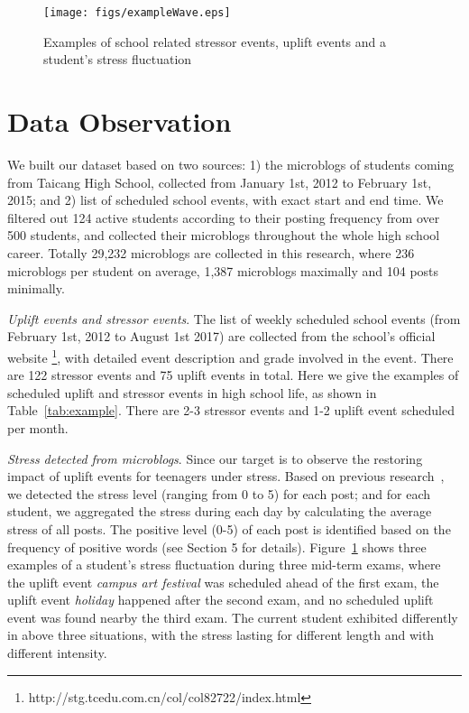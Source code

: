 \begin{figure}
\centering
\caption{Examples of school related stressor events, uplift events and a student's stress fluctuation}
\texttt{[image: figs/exampleWave.eps]}
\label{fig:example}
\end{figure}

\section{Data Observation}
\label{sec:obs}
We built our dataset based on two sources: 1) the microblogs of students coming from Taicang High School,
collected from January 1st, 2012 to February 1st, 2015;
and 2) list of scheduled school events, with exact start and end time.
We filtered out 124 active students according to their posting frequency from over 500 students,
and collected their microblogs throughout the whole high school career. Totally 29,232 microblogs are collected in this research,
where 236 microblogs per student on average, 1,387 microblogs maximally and 104 posts minimally.

\emph{Uplift events and stressor events}.
The list of weekly scheduled school events (from February 1st, 2012 to August 1st 2017) are collected from the school's official website
\footnote{http://stg.tcedu.com.cn/col/col82722/index.html}, with detailed event description and grade involved in the event.
There are 122 stressor events and 75 uplift events in total.
Here we give the examples of scheduled uplift and stressor events in high school life, as shown in Table~\ref{tab:example}.
There are 2-3 stressor events and 1-2 uplift event scheduled per month.


\emph{Stress detected from microblogs}.
Since our target is to observe the restoring impact of uplift events for teenagers under stress.
Based on previous research~\cite{XueUbicomp13},
we detected the stress level (ranging from 0 to 5) for each post;
and for each student, we aggregated the stress during each day by calculating the average stress of all posts.
The positive level (0-5) of each post is identified based on the frequency of positive words (see Section 5 for details).
Figure~\ref{fig:example} shows three examples of a student's stress fluctuation during three mid-term exams,
where the uplift event \emph{campus art festival} was scheduled ahead of the first exam,
the uplift event \emph{holiday} happened after the second exam,
and no scheduled uplift event was found nearby the third exam.
The current student exhibited differently in above three situations, with the stress lasting for different length and with different intensity.

